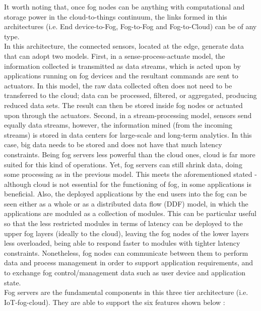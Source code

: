 It worth noting that, once fog nodes can be anything with computational and storage power in the cloud-to-things continuum, the links formed in this architectures (i.e. End device-to-Fog, Fog-to-Fog and Fog-to-Cloud) can be of any type.\\
\noindent\tab In this architecture, the connected sensors, located at the edge, generate data that can adopt two models. First, in a sense-process-actuate model, the information collected is transmitted as data streams, which is acted upon by applications running on fog devices and the resultant commands are sent to actuators. In this model, the raw data collected often does not need to be transferred to the cloud; data can be processed, filtered, or aggregated, producing reduced data sets. The result can then be stored inside fog nodes or actuated upon through the actuators. Second, in a stream-processing model, sensors send equally data streams, however, the information mined (from the incoming streams) is stored in data centers for large-scale and long-term analytics. In this case, big data needs to be stored and does not have that much latency constraints. Being fog servers less powerful than the cloud ones, cloud is far more suited for this kind of operations. Yet, fog servers can still shrink data, doing some processing as in the previous model. This meets the aforementioned stated - although cloud is not essential for the functioning of fog, in some applications is beneficial. Also, the deployed applications by the end users into the fog can be seen either as a whole or as a distributed data flow (DDF) model, in which the applications are moduled as a collection of modules. This can be particular useful so that the less restricted modules in terms of latency can be deployed to the upper fog layers (ideally to the cloud), leaving the fog nodes of the lower layers less overloaded, being able to respond faster to modules with tighter latency constraints. Nonetheless, fog nodes can communicate between them to perform data and process management in order to support application requirements, and to exchange fog control/management data such as user device and application state.\\
\noindent\tab Fog servers are the fundamental components in this three tier architecture (i.e. IoT-fog-cloud). They are able to support the six features shown below \cite{iorga2018fog}:
